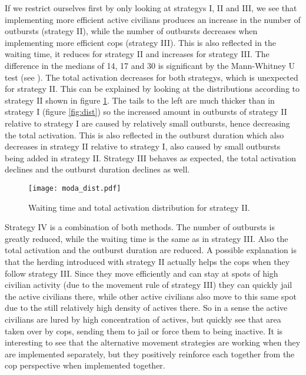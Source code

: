 \documentclass[11pt,a4paper,onecolumn]{article}
\begin{document}
If we restrict ourselves first by only looking at strategys I, II and III, we see that implementing more efficient active civilians produces an increase in the number of outbursts (strategy II), while the number of outbursts decreases when implementing more efficient cops (strategy III). This is also reflected in the waiting time, it reduces for strategy II and increases for strategy III. The difference in the medians of 14, 17 and 30 is significant by the Mann-Whitney U test (see \cite{Mann}). The total activation decreases for both strategys, which is unexpected for strategy II. This can be explained by looking at the distributions according to strategy II shown in figure \ref{fig:strategy2}. The tails to the left are much thicker than in strategy I (figure \ref{fig:dist}) so the increased amount in outbursts of strategy II relative to strategy I are caused by relatively small outbursts, hence decreasing the total activation. This is also reflected in the outburst duration which also decreases in strategy II relative to strategy I, also caused by small outbursts being added in strategy II. Strategy III behaves as expected, the total activation declines and the outburst duration declines as well.

\begin{figure}[H]
  \centering
  \texttt{[image: moda\_dist.pdf]}
  \caption{Waiting time  and total activation distribution for strategy II.}
  \label{fig:strategy2}
\end{figure}

Strategy IV is a combination of both methods. The number of outbursts is greatly reduced, while the waiting time is the same as in strategy III. Also the total activation and the outburst duration are reduced. A possible explanation is that the herding introduced with strategy II actually helps the cops when they follow strategy III. Since they move efficiently and can stay at spots of high civilian activity (due to the movement rule of strategy III) they can quickly jail the active civilians there, while other active civilians also move to this same spot due to the still relatively high density of actives there. So in a sense the active civilians are lured by high concentration of actives, but quickly see that area taken over by cops, sending them to jail or force them to being inactive. It is interesting to see that the alternative movement strategies are working when they are implemented separately, but they positively reinforce each together from the cop perspective when implemented together.
\end{document}
